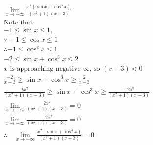 \documentclass[12pt]{article}
\begin{document}
            \begin{gather*}
                \lim_{x \to -\infty} \frac{x^2(\sin{x} + \cos^{3}{x})}{(x^2+1)(x-3)} \\[8pt]
                \text{Note that:} \\
                -1 \le \sin{x} \le 1, \\
                \because -1 \le \cos{x} \le {1} \\
                \therefore -1 \le \cos^{3}{x} \le 1 \\
                -2 \le \sin{x} + \cos^{3}{x} \le 2 \\[8pt]
                \text{$x$ is approaching negative $\infty$, so $(x-3) < 0$} \\
                \frac{-2}{x-3} \ge \sin{x} + \cos^{3}{x} \ge \frac{2}{x-3} \\[6pt]
                \frac{2x^2}{(x^2+1)(x-3)} \ge \sin{x} + \cos^{3}{x} \ge \frac{-2x^2}{(x^2+1)(x-3)} \\[10pt]
                \lim_{x \to -\infty}\frac{2x^2}{(x^2+1)(x-3)} = 0 \\[6pt]
                \lim_{x \to -\infty}\frac{-2x^2}{(x^2+1)(x-3)} = 0 \\[6pt]
                \therefore \quad \lim_{x \to -\infty} \frac{x^2(\sin{x} + \cos^{3}{x})}{(x^2+1)(x-3)} = 0
            \end{gather*}
\end{document}
